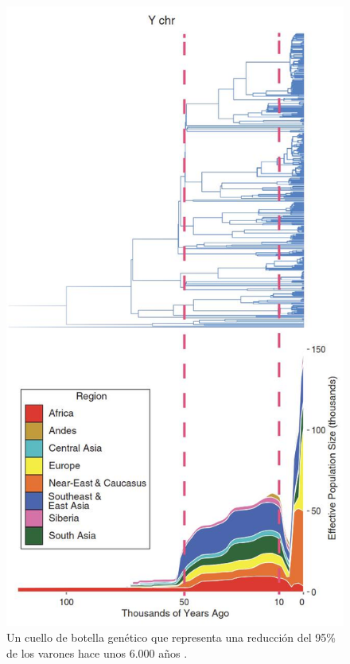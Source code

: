 \documentclass[10pt,twocolumn,letterpaper]{article}
\begin{document}
\begin{figure}[b]
\begin{center}
   \includegraphics[width=1\linewidth]{bottleneck.jpg}
\end{center}
   \caption{Un cuello de botella genético que representa una reducción del 95\% de los varones hace unos 6.000 años \cite{62}.}
\label{fig:10}
\label{fig:onecol}
\end{figure}
\end{document}
